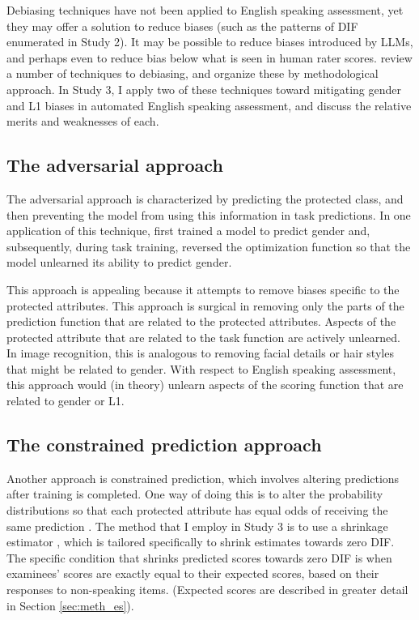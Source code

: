 \documentclass [PhD] {uclathes}
\begin{document}
Debiasing techniques have not been applied to English speaking assessment, yet they may offer a solution to reduce biases (such as the patterns of DIF enumerated in Study 2). It may be possible to reduce biases introduced by LLMs, and perhaps even to reduce bias below what is seen in human rater scores. \citet{sun2019mitigating} review a number of techniques to debiasing, and organize these by methodological approach. In Study 3, I apply two of these techniques toward mitigating gender and L1 biases in automated English speaking assessment, and discuss the relative merits and weaknesses of each. 

\subsection{The adversarial approach}

The adversarial approach is characterized by predicting the protected class, and then preventing the model from using this information in task predictions. In one application of this technique, \citet{wang2019balanced} first trained a model to predict gender and, subsequently, during task training, reversed the optimization function so that the model unlearned its ability to predict gender. 

This approach is appealing because it attempts to remove biases specific to the protected attributes. This approach is surgical in removing only the parts of the prediction function that are related to the protected attributes. Aspects of the protected attribute that are related to the task function are actively unlearned. In image recognition, this is analogous to removing facial details or hair styles that might be related to gender. With respect to English speaking assessment, this approach would (in theory) unlearn aspects of the scoring function that are related to gender or L1. 

\subsection{The constrained prediction approach}

Another approach is constrained prediction, which involves altering predictions after training is completed. One way of doing this is to alter the probability distributions so that each protected attribute has equal odds of receiving the same prediction \citep[e.g.][]{yatskar2016situation}. The method that I employ in Study 3 is to use a shrinkage estimator \citep{fourdrinier2018shrinkage}, which is tailored specifically to shrink estimates towards zero DIF. The specific condition that shrinks predicted scores towards zero DIF is when examinees’ scores are exactly equal to their expected scores, based on their responses to non-speaking items. (Expected scores are described in greater detail in Section \ref{sec:meth_es}).
\end{document}
